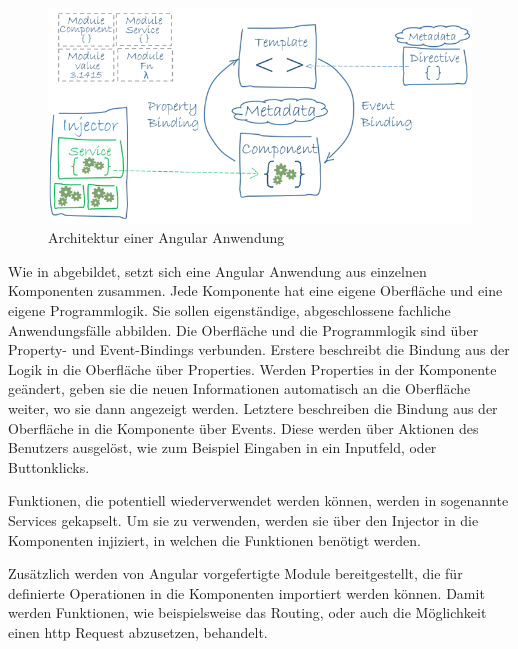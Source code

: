 

\newpage
{}

\begin{figure}[h]
\centering
\includegraphics[width=\textwidth]{res/images/overview2.png}
\caption{Architektur einer Angular Anwendung \cite{angularIO}}
\label{aaa}
\end{figure}

Wie in  abgebildet, setzt sich eine Angular Anwendung aus einzelnen Komponenten zusammen. Jede Komponente hat eine eigene Oberfläche und eine eigene Programmlogik. Sie sollen eigenständige, abgeschlossene fachliche Anwendungsfälle abbilden. Die Oberfläche und die Programmlogik sind über Property- und Event-Bindings verbunden. Erstere beschreibt die Bindung aus der Logik in die Oberfläche über Properties. Werden Properties in der Komponente geändert, geben sie die neuen Informationen automatisch an die Oberfläche weiter, wo sie dann angezeigt werden. Letztere beschreiben die Bindung aus der Oberfläche in die Komponente über Events. Diese werden über Aktionen des Benutzers ausgelöst, wie zum Beispiel Eingaben in ein Inputfeld, oder Buttonklicks.

Funktionen, die potentiell wiederverwendet werden können, werden in sogenannte Services gekapselt. Um sie zu verwenden, werden sie über den Injector in die Komponenten injiziert, in welchen die Funktionen benötigt werden.

Zusätzlich werden von Angular vorgefertigte Module bereitgestellt, die für definierte Operationen in die Komponenten importiert werden können. Damit werden Funktionen, wie beispielsweise das Routing, oder auch die Möglichkeit einen \gls{http} Request abzusetzen, behandelt.
